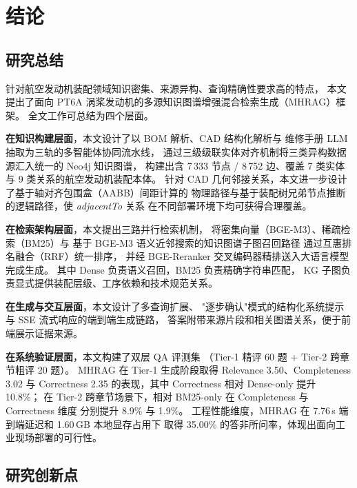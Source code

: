 \section{结论}
\label{sec:conclusion}

\subsection{研究总结}

针对航空发动机装配领域知识密集、来源异构、查询精确性要求高的特点，
本文提出了面向 PT6A 涡桨发动机的多源知识图谱增强混合检索生成（MHRAG）框架。
全文工作可总结为四个层面。

\textbf{在知识构建层面}，本文设计了以 BOM 解析、CAD 结构化解析与
维修手册 LLM 抽取为三轨的多智能体协同流水线，
通过三级级联实体对齐机制将三类异构数据源汇入统一的 Neo4j 知识图谱，
构建出含 7\,333 节点 / 8\,752 边、覆盖 7 类实体与 9 类关系的航空发动机装配本体。
针对 CAD 几何邻接关系，本文进一步设计了基于轴对齐包围盒（AABB）间距计算的
物理路径与基于装配树兄弟节点推断的逻辑路径，使 \textit{adjacentTo} 关系
在不同部署环境下均可获得合理覆盖。

\textbf{在检索架构层面}，本文提出三路并行检索机制，
将密集向量（BGE-M3）、稀疏检索（BM25）与
基于 BGE-M3 语义近邻搜索的知识图谱子图召回路径
通过互惠排名融合（RRF）统一排序，
并经 BGE-Reranker 交叉编码器精排送入大语言模型完成生成。
其中 Dense 负责语义召回，BM25 负责精确字符串匹配，
KG 子图负责显式提供装配层级、工序依赖和技术规范关系。

\textbf{在生成与交互层面}，本文设计了多查询扩展、
"逐步确认"模式的结构化系统提示与 SSE 流式响应的端到端生成链路，
答案附带来源片段和相关图谱关系，便于前端展示证据来源。

\textbf{在系统验证层面}，本文构建了双层 QA 评测集
（Tier-1 精评 60 题 + Tier-2 跨章节粗评 20 题）。
MHRAG 在 Tier-1 生成阶段取得 Relevance 3.50、Completeness 3.02 与
Correctness 2.35 的表现，其中 Correctness 相对 Dense-only 提升 10.8\%；
在 Tier-2 跨章节场景下，相对 BM25-only 在 Completeness 与 Correctness 维度
分别提升 8.9\% 与 1.9\%。
工程性能维度，MHRAG 在 7.76\,s 端到端延迟和 1.60\,GB 本地显存占用下
取得 35.00\% 的答非所问率，体现出面向工业现场部署的可行性。

\subsection{研究创新点}

